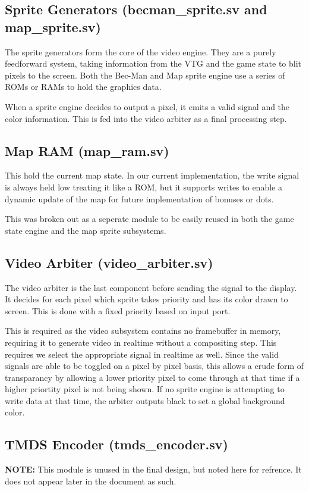 \documentclass[12pt]{article}
\begin{document}
\subsection{Sprite Generators (becman\_sprite.sv and map\_sprite.sv)}
The sprite generators form the core of the video engine. They are a purely
feedforward system, taking information from the VTG and the game state to blit
pixels to the screen. Both the Bec-Man and Map sprite engine use a series of
ROMs or RAMs to hold the graphics data.

When a sprite engine decides to output a pixel, it emits a valid signal and the
color information. This is fed into the video arbiter as a final processing
step.

\subsection{Map RAM (map\_ram.sv)}
This hold the current map state. In our current implementation, the write signal
is always held low treating it like a ROM, but it supports writes to enable a
dynamic update of the map for future implementation of bonuses or dots.

This was broken out as a seperate module to be easily reused in both the game
state engine and the map sprite subsystems.

\subsection{Video Arbiter (video\_arbiter.sv)}
The video arbiter is the last component before sending the signal to the
display. It decides for each pixel which sprite takes priority and has its color
drawn to screen. This is done with a fixed priority based on input port.

This is required as the video subsystem contains no framebuffer in memory,
requiring it to generate video in realtime without a compositing step. This
requires we select the appropriate signal in realtime as well. Since the valid
signals are able to be toggled on a pixel by pixel basis, this allows a crude
form of transparancy by allowing a lower priority pixel to come through at that
time if a higher priortity pixel is not being shown. If no sprite engine is
attempting to write data at that time, the arbiter outputs black to set a global
background color.

\subsection{TMDS Encoder (tmds\_encoder.sv)}
\textbf{NOTE:} This module is unused in the final design, but noted here for refrence. It does
not appear later in the document as such.
\end{document}
